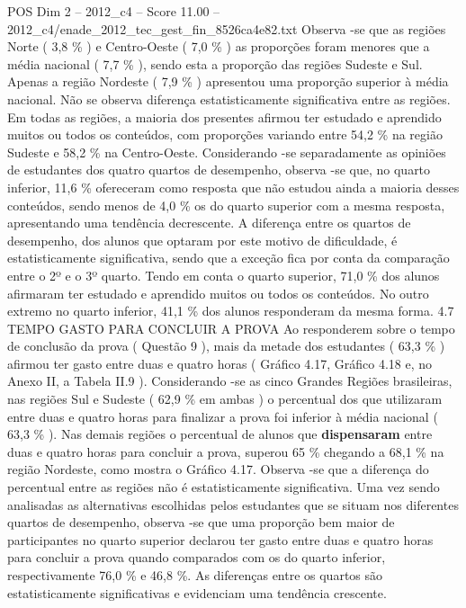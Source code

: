 \begin{textsample}{POS Dim 2 – 2012\_c4 – Score 11.00 – 2012\_c4/enade\_2012\_tec\_gest\_fin\_8526ca4e82.txt}
Observa -se que as regiões Norte ( 3,8 \% ) e Centro-Oeste ( 7,0 \% ) as proporções foram menores que a média nacional ( 7,7 \% ), sendo esta a proporção das regiões Sudeste e Sul.
Apenas a região Nordeste ( 7,9 \% ) apresentou uma proporção superior à média nacional.
Não se observa diferença estatisticamente significativa entre as regiões.
Em todas as regiões, a maioria dos presentes afirmou ter estudado e aprendido muitos ou todos os conteúdos, com proporções variando entre 54,2 \% na região Sudeste e 58,2 \% na Centro-Oeste.
Considerando -se separadamente as opiniões de estudantes dos quatro quartos de desempenho, observa -se que, no quarto inferior, 11,6 \% ofereceram como resposta que não estudou ainda a maioria desses conteúdos, sendo menos de 4,0 \% os do quarto superior com a mesma resposta, apresentando uma tendência decrescente.
A diferença entre os quartos de desempenho, dos alunos que optaram por este motivo de dificuldade, é estatisticamente significativa, sendo que a exceção fica por conta da comparação entre o 2º e o 3º quarto.
Tendo em conta o quarto superior, 71,0 \% dos alunos afirmaram ter estudado e aprendido muitos ou todos os conteúdos.
No outro extremo no quarto inferior, 41,1 \% dos alunos responderam da mesma forma. 4.7 TEMPO GASTO PARA CONCLUIR A PROVA Ao responderem sobre o tempo de conclusão da prova ( Questão 9 ), mais da metade dos estudantes ( 63,3 \% ) afirmou ter gasto entre duas e quatro horas ( Gráfico 4.17, Gráfico 4.18 e, no Anexo II, a Tabela II.9 ).
Considerando -se as cinco Grandes Regiões brasileiras, nas regiões Sul e Sudeste ( 62,9 \% em ambas ) o percentual dos que utilizaram entre duas e quatro horas para finalizar a prova foi inferior à média nacional ( 63,3 \% ).
Nas demais regiões o percentual de alunos que \textbf{dispensaram} entre duas e quatro horas para concluir a prova, superou 65 \% chegando a 68,1 \% na região Nordeste, como mostra o Gráfico 4.17.
Observa -se que a diferença do percentual entre as regiões não é estatisticamente significativa.
Uma vez sendo analisadas as alternativas escolhidas pelos estudantes que se situam nos diferentes quartos de desempenho, observa -se que uma proporção bem maior de participantes no quarto superior declarou ter gasto entre duas e quatro horas para concluir a prova quando comparados com os do quarto inferior, respectivamente 76,0 \% e 46,8 \%.
As diferenças entre os quartos são estatisticamente significativas e evidenciam uma tendência crescente.

\end{textsample}
